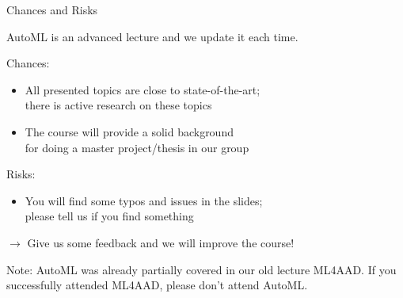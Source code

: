 \begin{frame}[c]{Chances and Risks}

AutoML is an advanced lecture and we update it each time.

\bigskip
\pause

Chances:
\begin{itemize}
  \item All presented topics are close to state-of-the-art;\\there is active research on these topics  
  \item The course will provide a solid background\\ for doing a master project/thesis in our group 
\end{itemize}

\medskip

Risks:
\begin{itemize}
  \item You will find some typos and issues in the slides;\\ please tell us if you find something
\end{itemize}

\medskip
\pause
$\to$ Give us some feedback and we will improve the course!

\medskip
\pause
Note: AutoML was already partially covered in our old lecture ML4AAD. 
If you successfully attended ML4AAD, please don't attend AutoML.

\end{frame}
